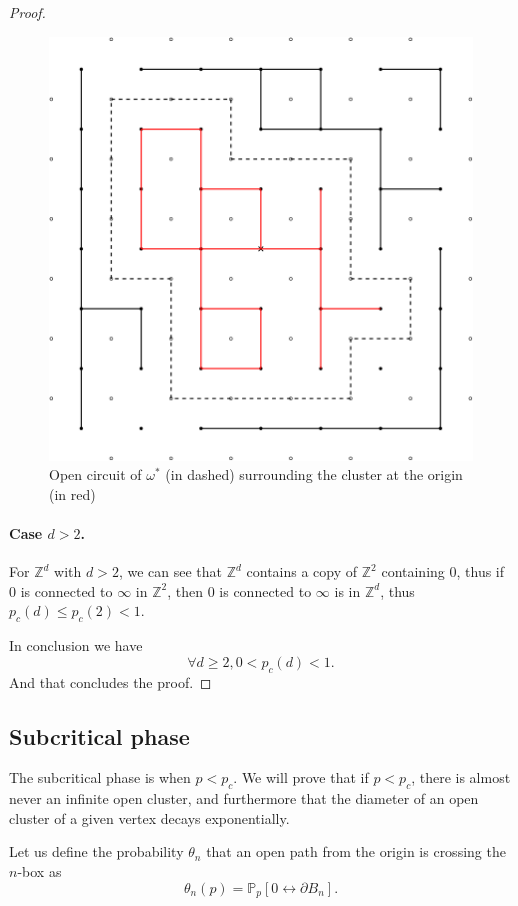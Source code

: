\documentclass[a4paper,11pt]{article}
\theoremstyle{plain}
\theoremstyle{definition}
\theoremstyle{remark}
\begin{document}
\begin{proof}
\begin{figure}
    \centering
    \includegraphics{finiteneckclace.png}
    \caption{Open circuit of $\omega^*$ (in dashed) surrounding the cluster at the origin (in red)}
    \label{fig:finiteneckl}
\end{figure}

\paragraph{Case $d > 2$.}
For $\mathbb{Z}^d$ with $d > 2$, we can see that $\mathbb{Z}^d$ contains a copy of $\mathbb{Z}^2$ containing $0$, thus if $0$ is connected to $\infty$ in $\mathbb{Z}^2$, then $0$ is connected to $\infty$ is in $\mathbb{Z}^d$, thus $p_c(d) \leq p_c(2) < 1$.

In conclusion we have
\[\forall d \geq 2, 0 < p_c(d) < 1.\]
And that concludes the proof.
\end{proof}

\subsection{Subcritical phase}

The subcritical phase is when $p < p_c$.
We will prove that if $p < p_c$, there is almost never an infinite open cluster, and furthermore that the diameter of an open cluster of a given vertex decays exponentially.

Let us define the probability $\theta_n$ that an open path from the origin is crossing the $n$-box as \[\theta_n(p)=\mathbb{P}_p[0 \longleftrightarrow \partial B_n].\]
\end{document}

